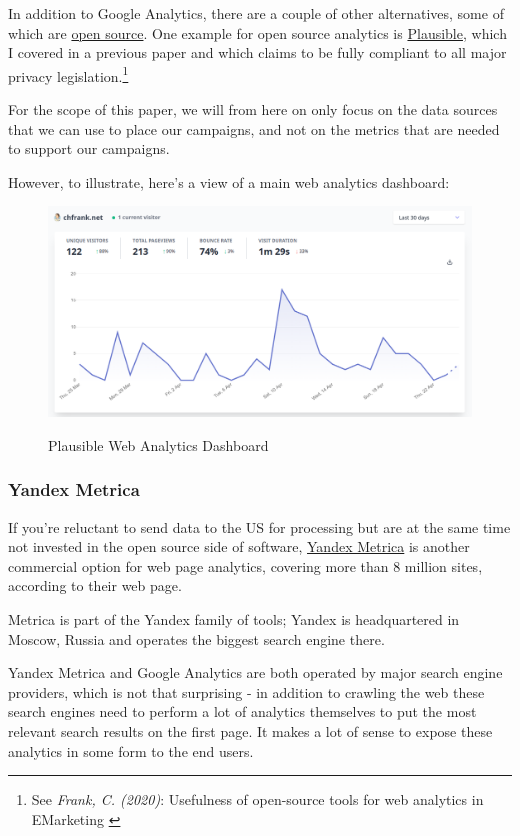 In addition to Google Analytics, there are a couple of other alternatives, some of which are \href{https://opensource.org/osd}{open source}. One example for open source analytics is \href{https://plausible.io/}{Plausible}, which I covered in a previous paper and which claims to be fully compliant to all major privacy legislation.\footnote{See \textit{Frank, C. (2020)}: Usefulness of open-source tools for web analytics in EMarketing \cite{previousPaper}} 

For the scope of this paper, we will from here on only focus on the data sources that we can use to place our campaigns, and not on the metrics that are needed to support our campaigns.

However, to illustrate, here's a view of a main web analytics dashboard:

\begin{figure}[H]
\centering
\caption {Plausible Web Analytics Dashboard}
\includegraphics[width=\linewidth]{images/plausible.png}
\label{fig:plausible}
\end{figure}

\subsubsection{Yandex Metrica}

If you're reluctant to send data to the US for processing but are at the same time not invested in the open source side of software, \href{https://metrica.yandex.com/}{Yandex Metrica} is another commercial option for web page analytics, covering more than 8 million sites, according to their web page.

Metrica is part of the Yandex family of tools; Yandex is headquartered in Moscow, Russia and operates the biggest search engine there.

Yandex Metrica and Google Analytics are both operated by major search engine providers, which is not that surprising - in addition to crawling the web these search engines need to perform a lot of analytics themselves to put the most relevant search results on the first page. It makes a lot of sense to expose these analytics in some form to the end users.

